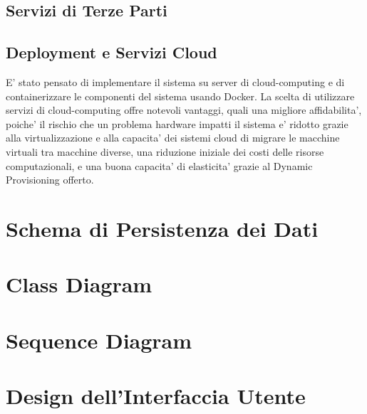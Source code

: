 \subsection{Servizi di Terze Parti}
\subsection{Deployment e Servizi Cloud}
E' stato pensato di implementare il sistema su server di cloud-computing e di containerizzare le componenti del sistema usando Docker. La scelta di utilizzare servizi di cloud-computing offre notevoli vantaggi, quali una migliore affidabilita', poiche' il rischio che un problema hardware impatti il sistema e' ridotto grazie alla virtualizzazione e alla capacita' dei sistemi cloud di migrare le macchine virtuali tra macchine diverse, una riduzione iniziale dei costi delle risorse computazionali, e una buona capacita' di elasticita' grazie al Dynamic Provisioning offerto.




\section{Schema di Persistenza dei Dati}
\section{Class Diagram}
\section{Sequence Diagram}
\section{Design dell'Interfaccia Utente}